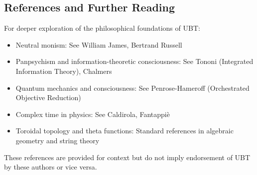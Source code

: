 \subsection{References and Further Reading}

For deeper exploration of the philosophical foundations of UBT:
\begin{itemize}
\item Neutral monism: See William James, Bertrand Russell
\item Panpsychism and information-theoretic consciousness: See Tononi (Integrated Information Theory), Chalmers
\item Quantum mechanics and consciousness: See Penrose-Hameroff (Orchestrated Objective Reduction)
\item Complex time in physics: See Caldirola, Fantappiè
\item Toroidal topology and theta functions: Standard references in algebraic geometry and string theory
\end{itemize}

These references are provided for context but do not imply endorsement of UBT by these authors or vice versa.
